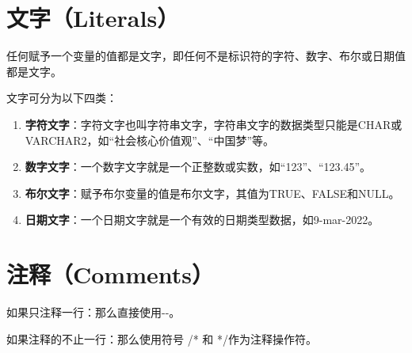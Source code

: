 \documentclass[11pt, a4paper, oneside, UTF8]{ctexbook}
\begin{document}
\section{文字（Literals）}
任何赋予一个变量的值都是文字，即任何不是标识符的字符、数字、布尔或日期值都是文字。

文字可分为以下四类：
\begin{enumerate}
  \item \textbf{字符文字}：字符文字也叫字符串文字，字符串文字的数据类型只能是CHAR或VARCHAR2，如“社会核心价值观”、“中国梦”等。
  \item \textbf{数字文字}：一个数字文字就是一个正整数或实数，如“123”、“123.45”。
  \item \textbf{布尔文字}：赋予布尔变量的值是布尔文字，其值为TRUE、FALSE和NULL。
  \item \textbf{日期文字}：一个日期文字就是一个有效的日期类型数据，如9-mar-2022。
\end{enumerate}

\section{注释（Comments）}
如果只注释一行：那么直接使用{-}{-}。

如果注释的不止一行：那么使用符号 /* 和 */作为注释操作符。

\end{document}
